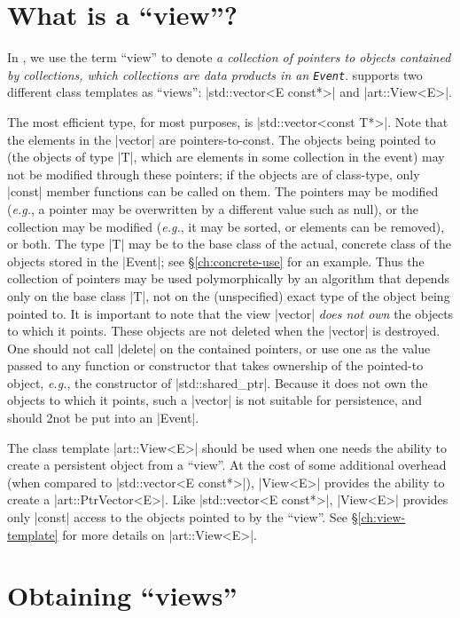 \documentclass[screen]{memarticle}
\newcommand{\art}{\name{art}\xspace}
\begin{document}
\chapter{What is a ``view''?}

In \art, we use the term ``view'' to denote \emph{a collection of
  pointers to objects contained by collections, which collections are
  data products in an \lstinline{Event}}.  \art supports two different
class templates as ``views'': |std::vector<E const*>| and
|art::View<E>|.

The most efficient type, for most purposes, %
is |std::vector<const T*>|. Note that the elements in the |vector| are
pointers-to-const. The objects being pointed to (the objects of type
|T|, which are elements in some collection in the event) may not be
modified through these pointers; if the objects are of class-type,
only |const| member functions can be called on them. The pointers may
be modified (\textit{e.g.}, a pointer may be overwritten by a
different value such as null), or the collection may be modified
(\textit{e.g.}, it may be sorted, or elements can be removed), or
both. The type |T| may be to the base class of the actual, concrete
class of the objects stored in the |Event|; see
\S\ref{ch:concrete-use} for an example. Thus the collection of
pointers may be used polymorphically by an algorithm that depends only
on the base class |T|, not on the (unspecified) exact type of the
object being pointed to. It is important to note that the view
|vector| \emph{does not own} the objects to which it points. These
objects are not deleted when the |vector| is destroyed. One should not
call |delete| on the contained pointers, or use one as the value
passed to any function or constructor that takes ownership of the
pointed-to object, \textit{e.g.}, the constructor of
|std::shared_ptr|. Because it does not own the objects to which it
points, such a |vector| is not suitable for persistence, and should
2not be put into an |Event|.

The class template |art::View<E>| should be used when one needs the
ability to create a persistent object from a ``view''. At the cost of
some additional overhead (when compared to |std::vector<E const*>|),
|View<E>| provides the ability to create a |art::PtrVector<E>|. Like
|std::vector<E const*>|, |View<E>| provides only |const| access to the
objects pointed to by the ``view''. See \S\ref{ch:view-template} for
more details on |art::View<E>|.

\chapter{Obtaining ``views''}
\end{document}

